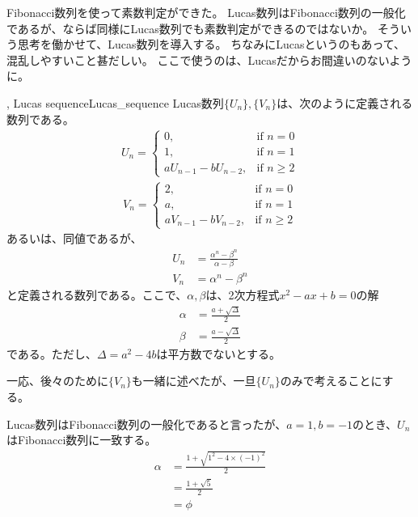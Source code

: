 Fibonacci数列を使って素数判定ができた。
Lucas数列はFibonacci数列の一般化であるが、ならば同様にLucas数列でも素数判定ができるのではないか。
そういう思考を働かせて、Lucas数列を導入する。
ちなみにLucasというのもあって、混乱しやすいこと甚だしい。
ここで使うのは、Lucasだからお間違いのないように。

\begin{Defi}{, Lucas sequence}{Lucas_sequence}
Lucas数列$\{U_n\},\{V_n\}$は、次のように定義される数列である。
\begin{align*}
U_n =
\begin{cases}
0, &\mbox{if } n = 0\\
1, &\mbox{if } n = 1\\
aU_{n - 1} - bU_{n - 2}, &\mbox{if } n \ge 2
\end{cases}
\end{align*}
\begin{align*}
V_n =
\begin{cases}
2, &\mbox{if } n = 0\\
a, &\mbox{if } n = 1\\
aV_{n - 1} - bV_{n - 2}, &\mbox{if } n \ge 2
\end{cases}
\end{align*}
あるいは、同値であるが、
\begin{align*}
U_n &= \frac{\alpha^n - \beta^n}{\alpha - \beta}\\
V_n &= \alpha^n - \beta^n
\end{align*}
と定義される数列である。ここで、$\alpha, \beta$は、2次方程式$x^2-ax+b=0$の解
\begin{align*}
\alpha &= \frac{a+\sqrt{\Delta}}{2}\\
\beta &= \frac{a-\sqrt{\Delta}}{2}
\end{align*}
である。ただし、$\Delta=a^2 - 4b$は平方数でないとする。
\end{Defi}

一応、後々のために$\{V_n\}$も一緒に述べたが、一旦$\{U_n\}$のみで考えることにする。


Lucas数列はFibonacci数列の一般化であると言ったが、$a=1, b=-1$のとき、$U_n$はFibonacci数列に一致する。
\begin{align*}
\alpha &= \frac{1 + \sqrt{1^2 - 4 \times (-1)^2}}{2}\\
&= \frac{1 + \sqrt{5}}{2}\\
&= \phi
\end{align*}

